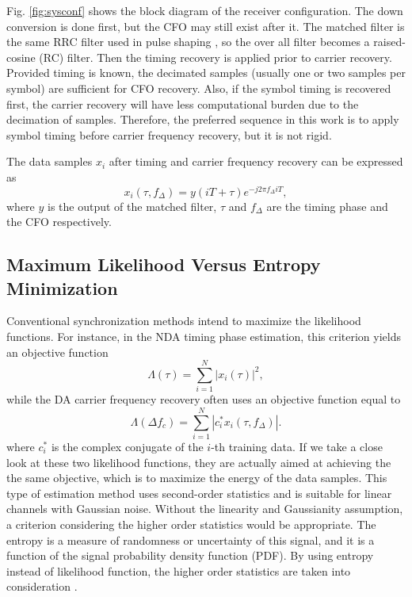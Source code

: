 \documentclass[journal,comsoc]{IEEEtran}
\begin{document}
Fig. \ref{fig:sysconf} shows the block diagram of the receiver configuration.
The down conversion is done first, but the CFO may still exist after it.
The matched filter is the same RRC filter used in pulse shaping , so the over all filter becomes a raised-cosine (RC) filter. 
Then the timing recovery is applied prior to carrier recovery.
Provided timing is known, the decimated samples (usually one or two samples per symbol) are sufficient for CFO recovery.
Also, if the symbol timing is recovered first, the carrier recovery will have less computational burden due to the decimation of samples.
Therefore, the preferred sequence in this work is to apply symbol timing before carrier frequency recovery, but it is not rigid.

The data samples \(x_i\) after timing and carrier frequency recovery can be expressed as
\begin{equation}
{x_i}( \tau ,{f_\Delta }) = y(iT +  \tau ){e^{ - j2\pi {f_\Delta }iT}},
\end{equation}
where \(y\) is the output of the matched filter, \(\tau\) and \(f_\Delta\) are the timing phase and the CFO respectively.


\subsection{Maximum Likelihood Versus Entropy Minimization}
Conventional synchronization methods intend to maximize the likelihood functions.
For instance, in the NDA timing phase estimation, this criterion yields an objective function
\begin{equation}
\Lambda(\tau) =\sum\limits_{i = 1}^N {{{\left| {{x_i}( \tau )} \right|}^2}}, 
\end{equation}
while the DA carrier frequency recovery often uses an objective function equal to
\begin{equation}
\Lambda ({\Delta f_c })=\sum\limits_{i = 1}^N {{{\left| {c_i^*{x_i}(\tau ,{f_\Delta })} \right|}}}. 
\end{equation}
where \(c_i^*\) is the complex conjugate of the \(i\)-th training data.
If we take a close look at these two likelihood functions, they are actually aimed at achieving the the same objective, which is to maximize the energy of the data samples.
This type of estimation method uses second-order statistics and is suitable for linear channels with Gaussian noise.
Without the linearity and Gaussianity assumption, a criterion considering the higher order statistics would be appropriate.
The entropy is a measure of randomness or uncertainty of this signal, and it is a function of the signal probability density function (PDF).
By using entropy instead of likelihood function, the higher order statistics are taken into consideration \cite{Santamaria2002}.
\end{document}
